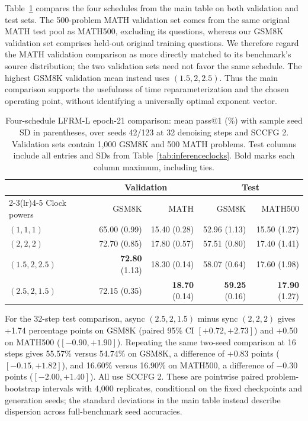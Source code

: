 \documentclass{article}
\begin{document}
Table~\ref{tab:inferenceclockfull} compares the four schedules from the main table on both validation and test sets. The 500-problem MATH validation set comes from the same original MATH test pool as MATH500, excluding its questions, whereas our GSM8K validation set comprises held-out original training questions. We therefore regard the MATH validation comparison as more directly matched to its benchmark's source distribution; the two validation sets need not favor the same schedule. The highest GSM8K validation mean instead uses $(1.5,2,2.5)$. Thus the main comparison supports the usefulness of time reparameterization and the chosen operating point, without identifying a universally optimal exponent vector.

\begin{table}[htbp]
\centering\small
\caption{Four-schedule LFRM-L epoch-21 comparison: mean pass@1 (\%) with sample seed SD in parentheses, over seeds 42/123 at 32 denoising steps and SCCFG 2. Validation sets contain 1,000 GSM8K and 500 MATH problems. Test columns include all entries and SDs from Table~\ref{tab:inferenceclocks}. Bold marks each column maximum, including ties.}
\label{tab:inferenceclockfull}
\begin{tabular}{lrrrr}
\toprule
& \multicolumn{2}{c}{Validation} & \multicolumn{2}{c}{Test} \\
\cmidrule(lr){2-3}\cmidrule(lr){4-5}
Clock powers & GSM8K & MATH & GSM8K & MATH500 \\
\midrule
$(1,1,1)$ & 65.00 {\scriptsize (0.99)} & 15.40 {\scriptsize (0.28)} & 52.96 {\scriptsize (1.13)} & 15.50 {\scriptsize (1.27)} \\
$(2,2,2)$ & 72.70 {\scriptsize (0.85)} & 17.80 {\scriptsize (0.57)} & 57.51 {\scriptsize (0.80)} & 17.40 {\scriptsize (1.41)} \\
$(1.5,2,2.5)$ & \textbf{72.80} {\scriptsize (1.13)} & 18.30 {\scriptsize (0.14)} & 58.07 {\scriptsize (0.64)} & 17.60 {\scriptsize (1.98)} \\
$(2.5,2,1.5)$ & 72.15 {\scriptsize (0.35)} & \textbf{18.70} {\scriptsize (0.14)} & \textbf{59.25} {\scriptsize (0.16)} & \textbf{17.90} {\scriptsize (1.27)} \\
\bottomrule
\end{tabular}
\end{table}

For the 32-step test comparison, async $(2.5,2,1.5)$ minus sync $(2,2,2)$ gives +1.74 percentage points on GSM8K (paired 95\% CI $[+0.72,+2.73]$) and +0.50 on MATH500 ($[-0.90,+1.90]$). Repeating the same two-seed comparison at 16 steps gives 55.57\% versus 54.74\% on GSM8K, a difference of +0.83 points ($[-0.15,+1.82]$), and 16.60\% versus 16.90\% on MATH500, a difference of $-0.30$ points ($[-2.00,+1.40]$). All use SCCFG 2. These are pointwise paired problem-bootstrap intervals with 4,000 replicates, conditional on the fixed checkpoints and generation seeds; the standard deviations in the main table instead describe dispersion across full-benchmark seed accuracies.
\end{document}
